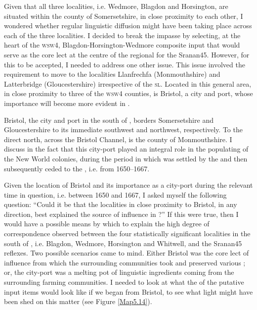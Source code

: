 Given that all three localities, i.e. Wedmore, Blagdon and Horsington, are situated within the county of Somersetshire, in close proximity to each other, I wondered whether regular linguistic diffusion might have been taking place across each of the three localities. I decided to break the impasse by selecting, at the heart of the \textsc{wsw4}, Blagdon-Horsington-Wedmore composite input that would serve as the core lect at the centre of the regional  for the Sranan45. However, for this to be accepted, I needed to address one other issue. This issue involved the requirement to move to the localities Llanfrechfa (Monmouthshire) and Latterbridge (Gloucestershire) irrespective of the \textsc{sl}. Located in this general area, in close proximity to three of the \textsc{wsw4} counties, is Bristol, a city and port, whose importance will become more evident in .

Bristol, the city and port in the south of , borders Somersetshire and Gloucestershire to its immediate southwest and northwest, respectively. To the direct north, across the Bristol Channel, is the county of Monmouthshire. I discuss in  the fact that this city-port played an integral role in the populating of the  New World colonies, during the period in which  was settled by the  and then subsequently ceded to the , i.e. from 1650--1667.

Given the location of Bristol and its importance as a city-port during the relevant time in question, i.e. between 1650 and 1667, I asked myself the following question: ``Could it be that the localities in close proximity to Bristol, in any direction, best explained the source of influence in ?'' If this were true, then I would have a possible means by which to explain the high degree of correspondence observed between the four statistically significant localities in the south of , i.e. Blagdon, Wedmore, Horsington and Whitwell, and the Sranan45 reflexes. Two possible scenarios came to mind. Either Bristol was the core lect of influence from which the surrounding communities took and preserved various ; or, the city-port was a melting pot of linguistic ingredients coming from the surrounding farming communities. I needed to look at what the  of the putative input items would look like if we began from Bristol, to see what light might have been shed on this matter (see Figure \ref{Map5.14}).

